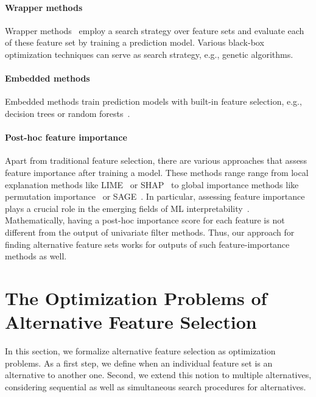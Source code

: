\documentclass{article}
\theoremstyle{definition}
\begin{document}
\paragraph{Wrapper methods}

Wrapper methods~\cite{kohavi1997wrappers} employ a search strategy over feature sets and evaluate each of these feature set by training a prediction model.
Various black-box optimization techniques can serve as search strategy, e.g., genetic algorithms.

\paragraph{Embedded methods}

Embedded methods train prediction models with built-in feature selection, e.g., decision trees or random forests~\cite{breiman2001random}.

\paragraph{Post-hoc feature importance}

Apart from traditional feature selection, there are various approaches that assess feature importance after training a model.
These methods range range from local explanation methods like LIME~\cite{ribeiro2016should} or SHAP~\cite{lundberg2017unified} to global importance methods like permutation importance~\cite{breiman2001random} or SAGE~\cite{covert2020understanding}.
In particular, assessing feature importance plays a crucial role in the emerging fields of ML interpretability~\cite{carvalho2019machine}.
Mathematically, having a post-hoc importance score for each feature is not different from the output of univariate filter methods.
Thus, our approach for finding alternative feature sets works for outputs of such feature-importance methods as well.

\section{The Optimization Problems of Alternative Feature Selection}
\label{sec:problems}

In this section, we formalize alternative feature selection as optimization problems.
As a first step, we define when an individual feature set is an alternative to another one.
Second, we extend this notion to multiple alternatives, considering sequential as well as simultaneous search procedures for alternatives.
\end{document}

